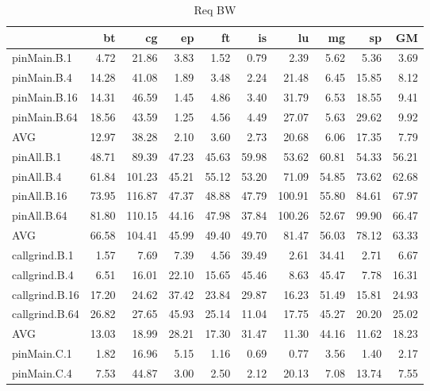 \iffalse

\begin{table*}[]
\caption{Req BW}
\label{comet_bw_pMpAcg_BC_itn_p3.5}\begin{center}
\begin{tabular}{lrrrrrrrrr}
\hline
                &    bt &     cg &    ep &    ft &    is &     lu &    mg &     sp &    GM \\
\hline
 pinMain.B.1    &  4.72 &  21.86 &  3.83 &  1.52 &  0.79 &   2.39 &  5.62 &   5.36 &  3.69 \\
 pinMain.B.4    & 14.28 &  41.08 &  1.89 &  3.48 &  2.24 &  21.48 &  6.45 &  15.85 &  8.12 \\
 pinMain.B.16   & 14.31 &  46.59 &  1.45 &  4.86 &  3.40 &  31.79 &  6.53 &  18.55 &  9.41 \\
 pinMain.B.64   & 18.56 &  43.59 &  1.25 &  4.56 &  4.49 &  27.07 &  5.63 &  29.62 &  9.92 \\
 AVG            & 12.97 &  38.28 &  2.10 &  3.60 &  2.73 &  20.68 &  6.06 &  17.35 &  7.79 \\
 pinAll.B.1     & 48.71 &  89.39 & 47.23 & 45.63 & 59.98 &  53.62 & 60.81 &  54.33 & 56.21 \\
 pinAll.B.4     & 61.84 & 101.23 & 45.21 & 55.12 & 53.20 &  71.09 & 54.85 &  73.62 & 62.68 \\
 pinAll.B.16    & 73.95 & 116.87 & 47.37 & 48.88 & 47.79 & 100.91 & 55.80 &  84.61 & 67.97 \\
 pinAll.B.64    & 81.80 & 110.15 & 44.16 & 47.98 & 37.84 & 100.26 & 52.67 &  99.90 & 66.47 \\
 AVG            & 66.58 & 104.41 & 45.99 & 49.40 & 49.70 &  81.47 & 56.03 &  78.12 & 63.33 \\
 callgrind.B.1  &  1.57 &   7.69 &  7.39 &  4.56 & 39.49 &   2.61 & 34.41 &   2.71 &  6.67 \\
 callgrind.B.4  &  6.51 &  16.01 & 22.10 & 15.65 & 45.46 &   8.63 & 45.47 &   7.78 & 16.31 \\
 callgrind.B.16 & 17.20 &  24.62 & 37.42 & 23.84 & 29.87 &  16.23 & 51.49 &  15.81 & 24.93 \\
 callgrind.B.64 & 26.82 &  27.65 & 45.93 & 25.14 & 11.04 &  17.75 & 45.27 &  20.20 & 25.02 \\
 AVG            & 13.03 &  18.99 & 28.21 & 17.30 & 31.47 &  11.30 & 44.16 &  11.62 & 18.23 \\
 pinMain.C.1    &  1.82 &  16.96 &  5.15 &  1.16 &  0.69 &   0.77 &  3.56 &   1.40 &  2.17 \\
 pinMain.C.4    &  7.53 &  44.87 &  3.00 &  2.50 &  2.12 &  20.13 &  7.08 &  13.74 &  7.55 \\

\end{tabular}
\end{center}
\end{table*}
